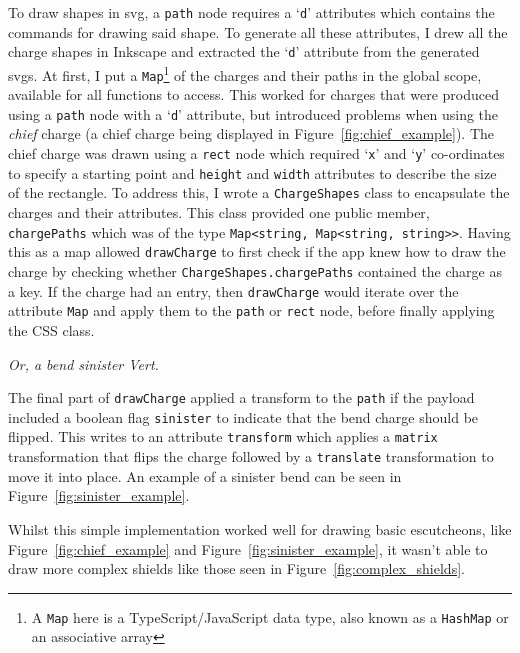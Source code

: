 \documentclass[nobib, a4paper, twoside, justified]{tufte-book}
\makeatletter
\newcommand{\svg}{\gls{svg}\@\xspace}
\newcommand{\svgs}{\glspl{svg}\@\xspace}
\newcommand{\charge}{\gls{charge}\@\xspace}
\newcommand{\charges}{\glspl{charge}\@\xspace}
\makeatother
\begin{document}
To draw shapes in \svg{}, a \texttt{path} node requires a `\texttt{d}' attributes which contains
the commands for drawing said shape. To generate all these attributes, I drew all the \charge{}
shapes in Inkscape and extracted the `\texttt{d}' attribute from the generated \svgs{}. At first, I
put a \texttt{Map}\footnote{A \texttt{Map} here is a TypeScript/JavaScript data type, also known as
a \texttt{HashMap} or an associative array} of the \charges{} and their paths in the global scope,
available for all functions to access. This worked for \charges{} that were produced using a
\texttt{path} node with a `\texttt{d}' attribute, but introduced problems when using the
\textit{chief} \charge{} (a chief \charge{} being displayed in Figure~\ref{fig:chief_example}). The
chief \charge{} was drawn using a \texttt{rect} node which required `\texttt{x}' and `\texttt{y}'
co-ordinates to specify a starting point and \texttt{height} and \texttt{width} attributes to
describe the size of the rectangle. To address this, I wrote a \texttt{ChargeShapes} class to
encapsulate the \charges{} and their attributes. This class provided one public member,
\texttt{chargePaths} which was of the type \texttt{Map<string, Map<string, string>\hphantom{}>}.
Having this as a map allowed \texttt{drawCharge} to first check if the app knew how to draw the
\charge{} by checking whether \texttt{ChargeShapes.chargePaths} contained the \charge{} as a key.
If the \charge{} had an entry, then \texttt{drawCharge} would iterate over the attribute
\texttt{Map} and apply them to the \texttt{path} or \texttt{rect} node, before finally applying the
CSS class.

\begin{marginfigure}
  \centering
  \def\svgwidth{0.8\linewidth}
  
  \caption{\textit{Or, a bend sinister Vert.}}\label{fig:sinister_example}
\end{marginfigure}

The final part of \texttt{drawCharge} applied a transform to the \texttt{path} if the payload
included a boolean flag \texttt{sinister} to indicate that the bend \charge{} should be flipped.
This writes to an attribute \texttt{transform} which applies a \texttt{matrix} transformation that
flips the \charge{} followed by a \texttt{translate} transformation to move it into place. An
example of a sinister bend can be seen in Figure~\ref{fig:sinister_example}.

Whilst this simple implementation worked well for drawing basic \glspl{escutcheon}, like
Figure~\ref{fig:chief_example} and Figure~\ref{fig:sinister_example}, it wasn't able to draw more
complex shields like those seen in Figure~\ref{fig:complex_shields}.
\end{document}
